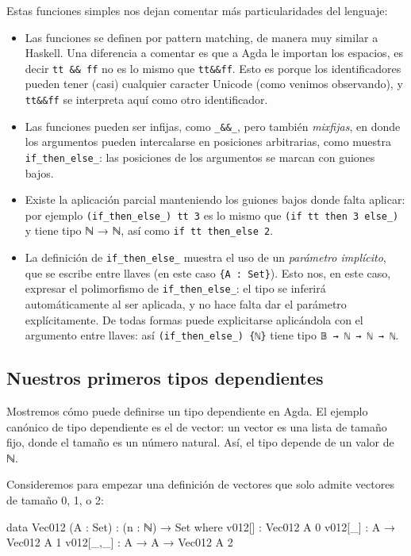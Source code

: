 \documentclass[11pt]{article} %
\begin{document}
Estas funciones simples nos dejan comentar más particularidades del lenguaje:

\begin{itemize}
    \item Las funciones se definen por pattern matching, de manera muy similar a Haskell. Una diferencia a comentar es que a Agda le importan los espacios, es decir \verb|tt && ff| no es lo mismo que \verb|tt&&ff|. Esto es porque los identificadores pueden tener (casi) cualquier caracter Unicode (como venimos observando), y \verb|tt&&ff| se interpreta aquí como otro identificador.
    \item Las funciones pueden ser infijas, como \verb|_&&_|, pero también \textit{mixfijas}, en donde los argumentos pueden intercalarse en posiciones arbitrarias, como muestra \verb|if_then_else_|: las posiciones de los argumentos se marcan con guiones bajos.
    \item Existe la aplicación parcial manteniendo los guiones bajos donde falta aplicar: por ejemplo \verb|(if_then_else_) tt 3| es lo mismo que \verb|(if tt then 3 else_)| y tiene tipo ℕ → ℕ, así como \verb|if tt then_else 2|.
    \item La definición de \verb|if_then_else_| muestra el uso de un \textit{parámetro implícito}, que se escribe entre llaves (en este caso \verb|{A : Set}|). Esto nos, en este caso, expresar el polimorfismo de \verb|if_then_else_|: el tipo se inferirá automáticamente al ser aplicada, y no hace falta dar el parámetro explícitamente. De todas formas puede explicitarse aplicándola con el argumento entre llaves: así \verb|(if_then_else_) {ℕ}| tiene tipo \verb|𝔹 → ℕ → ℕ → ℕ|.
\end{itemize}

\subsection{Nuestros primeros tipos dependientes}
Mostremos cómo puede definirse un tipo dependiente en Agda. El ejemplo canónico de tipo dependiente es el de vector: un vector es una lista de tamaño fijo, donde el tamaño es un número natural. Así, el tipo depende de un valor de ℕ. 

Consideremos para empezar una definición de vectores que solo admite vectores de tamaño 0, 1, o 2:

\begin{code}
data Vec012 (A : Set) : (n : ℕ) → Set where
  v012[] : Vec012 A 0
  v012[_] : A → Vec012 A 1
  v012[_,_] : A → A → Vec012 A 2
\end{code}
\end{document}
